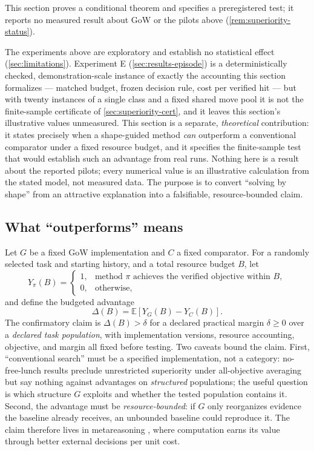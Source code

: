 \documentclass[11pt]{article}
\theoremstyle{gowthm}
\theoremstyle{gowplain}
\begin{document}
 This section proves a conditional theorem and specifies a
preregistered test; it reports no measured result about GoW or the pilots
above (\cref{rem:superiority-status}).

The experiments above are exploratory and establish no statistical effect
(\cref{sec:limitations}). Experiment E (\cref{sec:results-episode}) is a
deterministically checked, demonstration-scale instance of exactly the
accounting this section formalizes --- matched budget, frozen decision rule,
cost per verified hit --- but with twenty instances of a single class and a
fixed shared move pool it is not the finite-sample certificate of
\cref{sec:superiority-cert}, and it leaves this section's illustrative
values unmeasured. This section is a separate, \emph{theoretical}
contribution: it states precisely when a shape-guided method \emph{can}
outperform a conventional comparator under a fixed resource budget, and it
specifies the finite-sample test that would establish such an advantage from
real runs. Nothing here is a result about the reported pilots; every numerical
value is an illustrative calculation from the stated model, not measured data.
The purpose is to convert ``solving by shape'' from an attractive explanation
into a falsifiable, resource-bounded claim.

\subsection{What ``outperforms'' means}
\label{sec:superiority-def}
Let $G$ be a fixed GoW implementation and $C$ a fixed comparator. For a randomly
selected task and starting history, and a total resource budget $B$, let
\[
  Y_\pi(B) =
  \begin{cases}
    1, & \text{method } \pi \text{ achieves the verified objective within } B,\\
    0, & \text{otherwise,}
  \end{cases}
\]
and define the budgeted advantage
\[
  \Delta(B) = \mathbb{E}\!\left[Y_G(B) - Y_C(B)\right].
\]
The confirmatory claim is $\Delta(B) > \delta$ for a declared practical margin
$\delta \ge 0$ over a \emph{declared task population}, with implementation
versions, resource accounting, objective, and margin all fixed before testing.
Two caveats bound the claim. First, ``conventional search'' must be a specified
implementation, not a category: no-free-lunch results
\citep{wolpert1997nofreelunch} preclude unrestricted superiority under
all-objective averaging but say nothing against advantages on \emph{structured}
populations; the useful question is which structure $G$ exploits and whether the
tested population contains it. Second, the advantage must be
\emph{resource-bounded}: if $G$ only reorganizes evidence the baseline already
receives, an unbounded baseline could reproduce it. The claim therefore lives in
metareasoning \citep{russell1991right,horvitz1988reasoning}, where computation
earns its value through better external decisions per unit cost.
\end{document}
